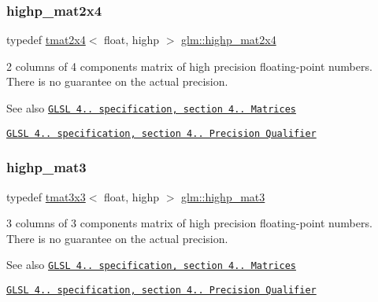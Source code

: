 \subsubsection{\texorpdfstring{highp\+\_\+mat2x4}{highp\_mat2x4}}
{\footnotesize\ttfamily typedef \hyperlink{structglm_1_1tmat2x4}{tmat2x4}$<$ float, highp $>$ \hyperlink{group__core__precision_ga74ae75c71c8c2b775714fb24454d6096}{glm\+::highp\+\_\+mat2x4}}

2 columns of 4 components matrix of high precision floating-\/point numbers. There is no guarantee on the actual precision.

\begin{DoxySeeAlso}{See also}
\href{http://www.opengl.org/registry/doc/GLSLangSpec.4.20.8.pdf}{\tt G\+L\+SL 4.. specification, section 4.. Matrices} 

\href{http://www.opengl.org/registry/doc/GLSLangSpec.4.20.8.pdf}{\tt G\+L\+SL 4.. specification, section 4.. Precision Qualifier} 
\end{DoxySeeAlso}
\mbox{\label{group__core__precision_ga5822a3dc6f6d421ee0b6a3c7f41a3ff1}} 
\subsubsection{\texorpdfstring{highp\+\_\+mat3}{highp\_mat3}}
{\footnotesize\ttfamily typedef \hyperlink{structglm_1_1tmat3x3}{tmat3x3}$<$ float, highp $>$ \hyperlink{group__core__precision_ga5822a3dc6f6d421ee0b6a3c7f41a3ff1}{glm\+::highp\+\_\+mat3}}

3 columns of 3 components matrix of high precision floating-\/point numbers. There is no guarantee on the actual precision.

\begin{DoxySeeAlso}{See also}
\href{http://www.opengl.org/registry/doc/GLSLangSpec.4.20.8.pdf}{\tt G\+L\+SL 4.. specification, section 4.. Matrices} 

\href{http://www.opengl.org/registry/doc/GLSLangSpec.4.20.8.pdf}{\tt G\+L\+SL 4.. specification, section 4.. Precision Qualifier} 
\end{DoxySeeAlso}
\mbox{\label{group__core__precision_ga5df0f5c4120d0fd47825506c86b7814c}} 
